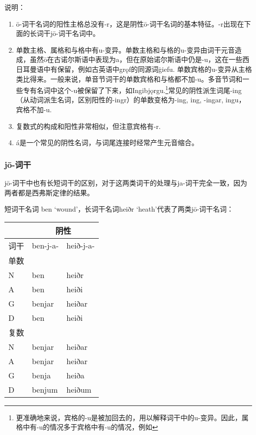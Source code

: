 说明：

\begin{enumerate}

  \item
        ō-词干名词的阳性主格总没有-r，这是阴性ō-词干名词的基本特征。-r出现在下面的长词干jō-词干名词中。
  \item
        单数主格、属格和与格中有u-变异。单数主格和与格的u-变异由词干元音造成，虽然ō在古诺尔斯语中表现为a，但在原始诺尔斯语中仍是-u，这在一些西日耳曼语中有保留，例如古英语中grǫf的同源词ġiefu.
        单数宾格的u-变异从主格类比得来。一般来说，单音节词干的单数宾格和与格都不加-u。多音节词和一些专有名词中这个-u被保留了下来，如Ingibjǫrgu.\footnote{更准确地来说，宾格的-u是被加回去的，用以解释词干中的u-变异。因此，属格中有-u的情况多于宾格中有-u的情况，例如}常见的阴性派生词尾-ing（从动词派生名词，区别阳性的-ingr）的单数变格为-ing,
        ing, -ingar, ingu，宾格不加-u.
  \item
        复数式的构成和阳性非常相似，但注意宾格有-r.
  \item
        á是一个常见的阴性名词，与词尾连接时经常产生元音缩合。
\end{enumerate}

\subsubsection{jō-词干}

jō-词干中也有长短词干的区别，对于这两类词干的处理与ja-词干完全一致，因为两者都是西弗斯定律的结果。

短词干名词 ben `wound'，长词干名词heiðr `heath'代表了两类jō-词干名词：

\begin{longtable}{lll}
  \toprule
       & \multicolumn{2}{c}{\textbf{阴性}}             \\
  \midrule
  \endhead
  \bottomrule
  \endfoot
  词干 & ben-j-a-                          & heið-j-a- \\
  单数 &                                   &           \\
  N    & ben                               & heiðr     \\
  A    & ben                               & heiði     \\
  G    & benjar                            & heiðar    \\
  D    & ben                               & heiði     \\
  复数 &                                   &           \\
  N    & benjar                            & heiðar    \\
  A    & benjar                            & heiðar    \\
  G    & benja                             & heiða     \\
  D    & benjum                            & heiðum    \\
\end{longtable}

